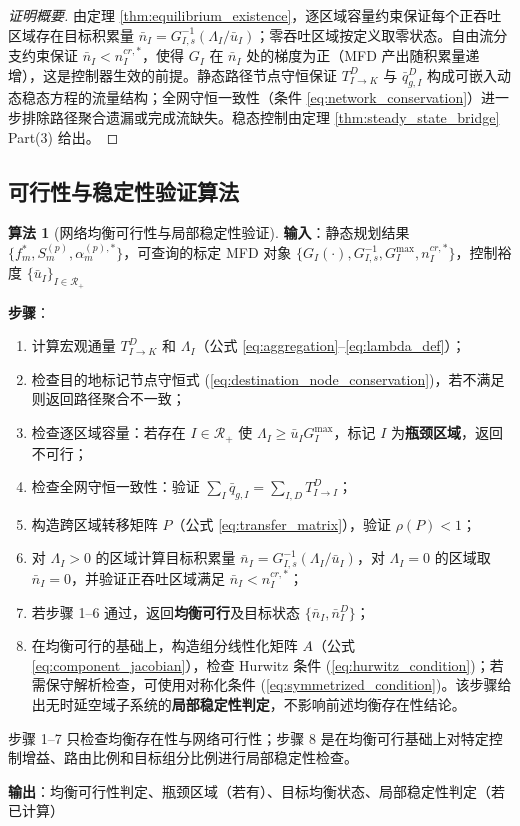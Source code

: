 \documentclass[a4paper,12pt]{article}
\theoremstyle{plain}
\theoremstyle{definition}
\newtheorem{algorithm}[theorem]{算法}
\theoremstyle{remark}
\begin{document}
\begin{proof}[证明概要]
由定理 \ref{thm:equilibrium_existence}，逐区域容量约束保证每个正吞吐区域存在目标积累量 $\bar{n}_I = G_{I,s}^{-1}(\Lambda_I/\bar u_I)$；零吞吐区域按定义取零状态。自由流分支约束保证 $\bar{n}_I < n_I^{cr,*}$，使得 $G_I$ 在 $\bar{n}_I$ 处的梯度为正（MFD 产出随积累量递增），这是控制器生效的前提。静态路径节点守恒保证 $T_{I\to K}^D$ 与 $\bar q_{g,I}^D$ 构成可嵌入动态稳态方程的流量结构；全网守恒一致性（条件 \ref{eq:network_conservation}）进一步排除路径聚合遗漏或完成流缺失。稳态控制由定理 \ref{thm:steady_state_bridge} Part(3) 给出。
\end{proof}

\subsection{可行性与稳定性验证算法}

\begin{algorithm}[网络均衡可行性与局部稳定性验证]
\textbf{输入}：静态规划结果 $\{f_m^*, S_m^{(p)}, \alpha_m^{(p),*}\}$，可查询的标定 MFD 对象 $\{G_I(\cdot),G_{I,s}^{-1},G_I^{\max}, n_I^{cr,*}\}$，控制裕度 $\{\bar u_I\}_{I\in\mathcal R_+}$

\textbf{步骤}：
\begin{enumerate}
    \item 计算宏观通量 $T_{I \to K}^D$ 和 $\Lambda_I$（公式 \ref{eq:aggregation}--\ref{eq:lambda_def}）；
    \item 检查目的地标记节点守恒式 (\ref{eq:destination_node_conservation})，若不满足则返回路径聚合不一致；
    \item 检查逐区域容量：若存在 $I\in\mathcal R_+$ 使 $\Lambda_I \ge \bar u_I G_I^{\max}$，标记 $I$ 为\textbf{瓶颈区域}，返回不可行；
    \item 检查全网守恒一致性：验证 $\sum_I \bar{q}_{g,I} = \sum_{I,D} T_{I \to I}^D$；
    \item 构造跨区域转移矩阵 $P$（公式 \ref{eq:transfer_matrix}），验证 $\rho(P)<1$；
    \item 对 $\Lambda_I>0$ 的区域计算目标积累量 $\bar{n}_I = G_{I,s}^{-1}(\Lambda_I/\bar u_I)$，对 $\Lambda_I=0$ 的区域取 $\bar n_I=0$，并验证正吞吐区域满足 $\bar{n}_I < n_I^{cr,*}$；
    \item 若步骤 1--6 通过，返回\textbf{均衡可行}及目标状态 $\{\bar{n}_I, \bar{n}_I^D\}$；
    \item 在均衡可行的基础上，构造组分线性化矩阵 $A$（公式 \ref{eq:component_jacobian}），检查 Hurwitz 条件 (\ref{eq:hurwitz_condition})；若需保守解析检查，可使用对称化条件 (\ref{eq:symmetrized_condition})。该步骤给出无时延空域子系统的\textbf{局部稳定性判定}，不影响前述均衡存在性结论。
\end{enumerate}

步骤 1--7 只检查均衡存在性与网络可行性；步骤 8 是在均衡可行基础上对特定控制增益、路由比例和目标组分比例进行局部稳定性检查。

\textbf{输出}：均衡可行性判定、瓶颈区域（若有）、目标均衡状态、局部稳定性判定（若已计算）
\end{algorithm}
\end{document}

